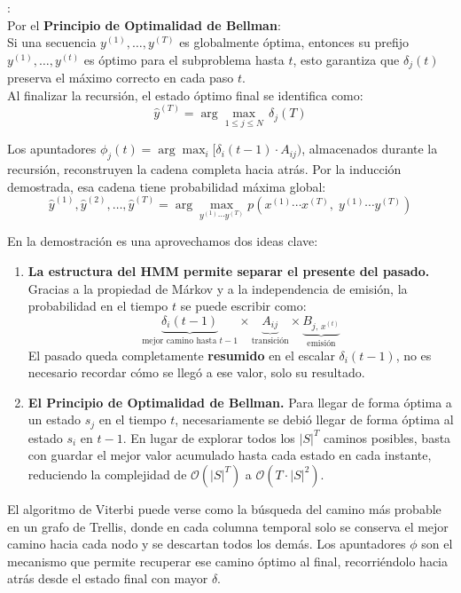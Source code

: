 \bigskip

:\\
Por el \textbf{Principio de Optimalidad de Bellman}:\\
Si una secuencia $y^{(1)}, \ldots, y^{(T)}$ es globalmente óptima, entonces su prefijo $y^{(1)}, \ldots, y^{(t)}$ es
óptimo para el subproblema hasta $t$, esto garantiza que $\delta_j(t)$ preserva el máximo correcto en cada paso
$t$.\\

Al finalizar la recursión, el estado óptimo final se identifica como:
\[
\hat{y}^{(T)} = \arg\max_{1 \leq j \leq N}\,\delta_j(T)
\]

Los apuntadores $\phi_j(t) = \arg\max_{i}\bigl[\delta_i(t-1)\cdot A_{ij}\bigr)$, almacenados durante la recursión,
reconstruyen la cadena completa hacia atrás. Por la inducción demostrada, esa cadena tiene probabilidad máxima
global:
\[
\hat{y}^{(1)}, \hat{y}^{(2)}, \ldots, \hat{y}^{(T)}
= \arg\max_{y^{(1)} \cdots y^{(T)}} p\!\left(x^{(1)} \cdots x^{(T)},\; y^{(1)} \cdots y^{(T)}\right)
\]

\bigskip
\bigskip

En la demostración es una aprovechamos dos ideas clave:
\begin{enumerate}
\item \textbf{La estructura del HMM permite separar el presente del pasado.}
  Gracias a la propiedad de Márkov y a la independencia de emisión, la probabilidad en el tiempo $t$ se puede
  escribir como:
  \[
  \underbrace{\delta_i(t-1)}_{\text{mejor camino hasta } t-1}
  \times
  \underbrace{A_{ij}}_{\text{transición}}
  \times
  \underbrace{B_{j,\,x^{(t)}}}_{\text{emisión}}
  \]
  El pasado queda completamente \textbf{resumido} en el escalar $\delta_i(t-1)$, no es necesario recordar cómo
  se llegó a ese valor, solo su resultado.

\item \textbf{El Principio de Optimalidad de Bellman.}
  Para llegar de forma óptima a un estado $s_j$ en el tiempo $t$, necesariamente se debió llegar de forma óptima
  al estado $s_i$ en $t-1$. En lugar de explorar todos los $|S|^T$ caminos posibles, basta con guardar el mejor
  valor acumulado hasta cada estado en cada instante, reduciendo la complejidad de
  $\mathcal{O}(|S|^T)$ a $\mathcal{O}(T \cdot |S|^2)$.
\end{enumerate}

El algoritmo de Viterbi puede verse como la búsqueda del camino más probable en un grafo de Trellis, donde en
cada columna temporal solo se conserva el mejor camino hacia cada nodo y se descartan todos los demás.
Los apuntadores $\phi$ son el mecanismo que permite recuperar ese camino óptimo al final, recorriéndolo
hacia atrás desde el estado final con mayor $\delta$.
